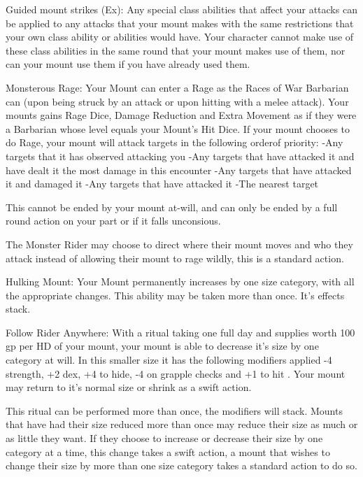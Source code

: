 Guided mount strikes (Ex): Any special class abilities that affect your attacks can be applied to any attacks that your mount makes with the same restrictions that your own class ability or abilities would have. Your character cannot make use of these class abilities in the same round that your mount makes use of them, nor can your mount use them if you have already used them.

Monsterous Rage: Your Mount can enter a Rage as the Races of War Barbarian can (upon being struck by an attack or upon hitting with a melee attack). Your mounts gains Rage Dice, Damage Reduction and Extra Movement as if they were a Barbarian whose level equals your Mount's Hit Dice. If your mount chooses to do Rage, your mount will attack targets in the following orderof priority:
-Any targets that it has observed attacking you
-Any targets that have attacked it and have dealt it the most damage in this encounter
-Any targets that have attacked it and damaged it
-Any targets that have attacked it
-The nearest target

This cannot be ended by your mount at-will, and can only be ended by a full round action on your part or if it falls unconsious.

The Monster Rider may choose to direct where their mount moves and who they attack instead of allowing their mount to rage wildly, this is a standard action.

Hulking Mount: Your Mount permanently increases by one size category, with all the appropriate changes. This ability may be taken more than once. It's effects stack.

Follow Rider Anywhere: With a ritual taking one full day and supplies worth 100 gp per HD of your mount, your mount is able to decrease it's size by one category at will. In this smaller size it has the following modifiers applied -4 strength, +2 dex, +4 to hide, -4 on grapple checks and +1 to hit . Your mount may return to it's normal size or shrink as a swift action.

This ritual can be performed more than once, the modifiers will stack. Mounts that have had their size reduced more than once may reduce their size as much or as little they want. If they choose to increase or decrease their size by one category at a time, this change takes a swift action, a mount that wishes to change their size by more than one size category takes a standard action to do so. 